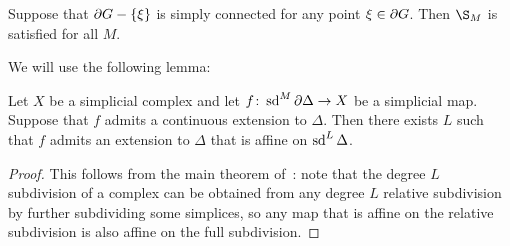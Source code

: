 \documentclass[a4paper]{article}
\begin{document}
\begin{proposition}\label{prop:sufficient_condition}
  Suppose that $\partial G - \left\{\xi\right\}$ is simply connected for any point $\xi
  \in \partial G$. Then $\S_M$ is satisfied for all $M$.
\end{proposition}

We will use the following lemma:

\begin{lemma}\label{lem:relative_approximation}
  Let $X$ be a simplicial complex and let $f\colon\operatorname{sd}^M\partial\Delta\to X$ be
  a simplicial map. Suppose that $f$ admits a continuous extension to $\Delta$.
  Then there exists $L$ such that $f$ admits an extension to $\Delta$ that is
  affine on $\operatorname{sd}^L\Delta$. 
\end{lemma}

\begin{proof}
  This follows from the main theorem of~\cite{zeeman64}: note that the degree
  $L$ subdivision of a complex can be obtained from any degree $L$ relative
  subdivision by further subdividing some simplices, so any map that is affine
  on the relative subdivision is also affine on the full subdivision.
\end{proof}
\end{document}
